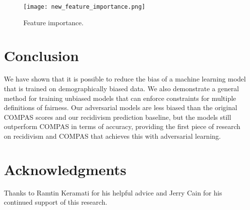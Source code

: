 \documentclass{article}
\begin{document}

\begin{figure}
\begin{center}
\texttt{[image: new\_feature\_importance.png]}
\vspace{-3mm}
\caption{Feature importance.}
\end{center}
\vspace{-7mm}
\end{figure}

\vspace{-2mm}
\section{Conclusion}
\vspace{-2mm}
We have shown that it is possible to reduce the bias of a machine learning model that is trained on demographically biased data. We also demonstrate a general method for training unbiased models that can enforce constraints for multiple definitions of fairness. Our adversarial models are less biased than the original COMPAS scores and our recidivism prediction baseline, but the models still outperform COMPAS in terms of accuracy, providing the first piece of research on recidivism and COMPAS that achieves this with adversarial learning.


\section*{Acknowledgments}

Thanks to Ramtin Keramati for his helpful advice and Jerry Cain for his continued support of this research.



\end{document}

